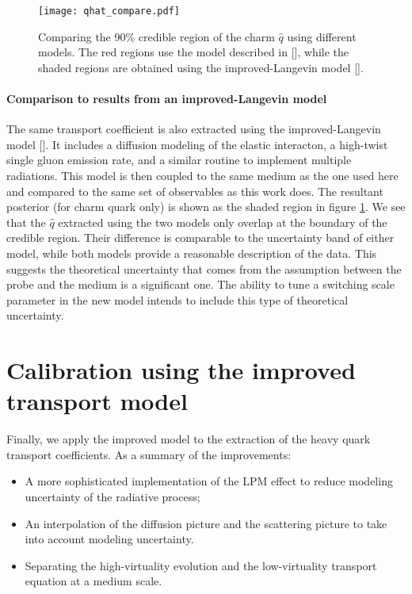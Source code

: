 \begin{figure}
\texttt{[image: qhat\_compare.pdf]}
\caption{Comparing the 90\% credible region of the charm $\hat{q}$ using different models. The red regions use the model described in [], while the  shaded regions are obtained using  the improved-Langevin model [].}\label{fig:LBT:compare_qhat}
\end{figure}

\paragraph{Comparison to results from an improved-Langevin model}
The same transport coefficient is also extracted using the improved-Langevin model [].
It includes a diffusion modeling of the elastic interacton, a high-twist single gluon emission rate, and a similar routine to implement multiple radiations.
This model is then coupled to the same medium as the one used here and compared to the same set of observables as this work does.
The resultant posterior (for charm quark only) is shown as the shaded region in figure \ref{fig:LBT:compare_qhat}.
We see that the $\hat{q}$ extracted using the two models only overlap at the boundary of the credible region.
Their difference is comparable to the uncertainty band of either model, while both models provide a reasonable description of the data.
This suggests the theoretical uncertainty that comes from the assumption between the probe and the medium is a significant one.
The ability to tune a switching scale parameter in the new model intends to include this type of theoretical uncertainty.

\section{Calibration using the improved transport model}
Finally, we apply the improved model to the extraction of the heavy quark transport coefficients.
As a summary of the improvements:
\begin{itemize}
\item A more sophisticated implementation of the LPM effect to reduce modeling uncertainty of the radiative process;
\item An interpolation of the diffusion picture and the scattering picture to take into account modeling uncertainty.
\item Separating the high-virtuality evolution and the low-virtuality transport equation at a medium scale.
\end{itemize}

